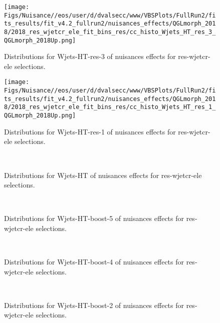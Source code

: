 \begin{figure*}[htbp]  
\centering 
\texttt{[image: Figs/Nuisance//eos/user/d/dvalsecc/www/VBSPlots/FullRun2/fits\_results/fit\_v4.2\_fullrun2/nuisances\_effects/QGLmorph\_2018/2018\_res\_wjetcr\_ele\_fit\_bins\_res/cc\_histo\_Wjets\_HT\_res\_3\_QGLmorph\_2018Up.png]}
\\ 
\caption{ 
   Distributions for Wjets-HT-res-3 of nuisances effects for res-wjetcr-ele selections.
} 
\label{fig:Wjets_HT_res_3_res_wjetcr_ele} 
\end{figure*} 




\begin{figure*}[htbp]  
\centering 
\texttt{[image: Figs/Nuisance//eos/user/d/dvalsecc/www/VBSPlots/FullRun2/fits\_results/fit\_v4.2\_fullrun2/nuisances\_effects/QGLmorph\_2018/2018\_res\_wjetcr\_ele\_fit\_bins\_res/cc\_histo\_Wjets\_HT\_res\_1\_QGLmorph\_2018Up.png]}
\\ 
\caption{ 
   Distributions for Wjets-HT-res-1 of nuisances effects for res-wjetcr-ele selections.
} 
\label{fig:Wjets_HT_res_1_res_wjetcr_ele} 
\end{figure*} 




\begin{figure*}[htbp]  
\centering 
\\ 
\caption{ 
   Distributions for Wjets-HT of nuisances effects for res-wjetcr-ele selections.
} 
\label{fig:Wjets_HT_res_wjetcr_ele} 
\end{figure*} 




\begin{figure*}[htbp]  
\centering 
\\ 
\caption{ 
   Distributions for Wjets-HT-boost-5 of nuisances effects for res-wjetcr-ele selections.
} 
\label{fig:Wjets_HT_boost_5_res_wjetcr_ele} 
\end{figure*} 




\begin{figure*}[htbp]  
\centering 
\\ 
\caption{ 
   Distributions for Wjets-HT-boost-4 of nuisances effects for res-wjetcr-ele selections.
} 
\label{fig:Wjets_HT_boost_4_res_wjetcr_ele} 
\end{figure*} 




\begin{figure*}[htbp]  
\centering 
\\ 
\caption{ 
   Distributions for Wjets-HT-boost-2 of nuisances effects for res-wjetcr-ele selections.
} 
\label{fig:Wjets_HT_boost_2_res_wjetcr_ele} 
\end{figure*} 




